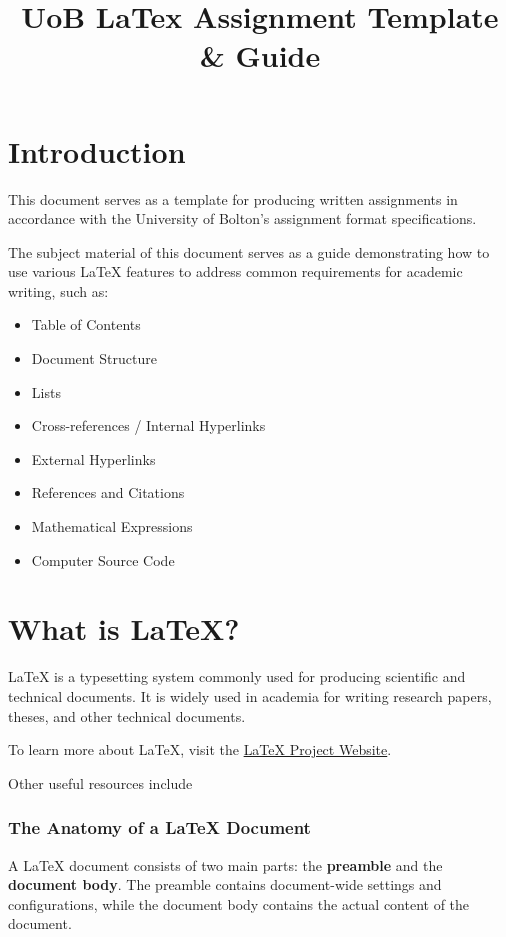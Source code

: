 \documentclass[12pt]{article}
\title{UoB LaTex Assignment Template & Guide}
\begin{document}

\tableofcontents


\section{Introduction}
\label{sec:introduction}

This document serves as a template for producing written assignments in accordance with the University of Bolton's assignment format specifications.

The subject material of this document serves as a guide demonstrating how to use various \LaTeX{} features to address common requirements for academic writing, such as:

\begin{itemize}
  \item Table of Contents
  \item Document Structure
  \item Lists
  \item Cross-references / Internal Hyperlinks
  \item External Hyperlinks
  \item References and Citations
  \item Mathematical Expressions
  \item Computer Source Code
\end{itemize}

\section{What is LaTeX?}
\label{sec:what-is-latex}

\LaTeX{} is a typesetting system commonly used for producing scientific and technical documents. It is widely used in academia for writing research papers, theses, and other technical documents. 

To learn more about \LaTeX{}, visit the \href{https://www.latex-project.org/}{\LaTeX{} Project Website}. 

Other useful resources include \cite{mittelbach_2023_the}

\subsubsection{The Anatomy of a LaTeX Document}
\label{sec:the-anatomy-of-a-latex-document}

A \LaTeX{} document consists of two main parts: the \textbf{preamble} and the \textbf{document body}. The preamble contains document-wide settings and configurations, while the document body contains the actual content of the document.
\end{document}
